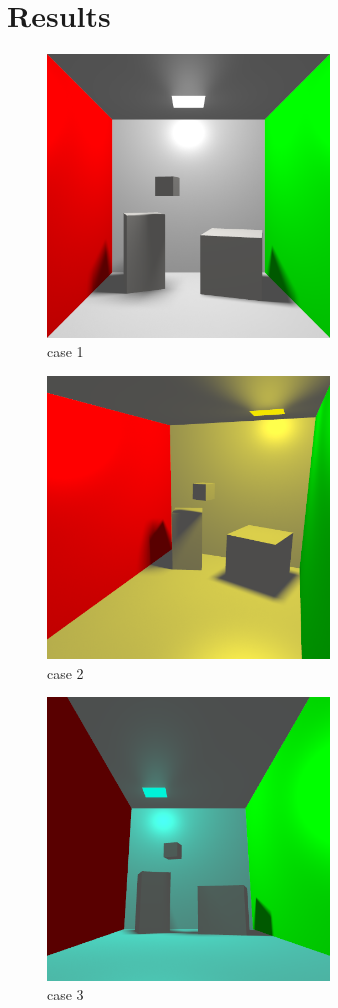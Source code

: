 \documentclass[acmtog]{acmart}
\begin{document}
\section{Results}
\begin{figure}[h]
	\centering
	\includegraphics[height = 7.5cm]{output1.png}
	\caption{case 1}
\end{figure}
\begin{figure}[h]
	\centering
	\includegraphics[height = 7.5cm]{output2.png}
	\caption{case 2}
\end{figure}
\begin{figure}[h]
	\centering
	\includegraphics[height = 7.5cm]{output3.png}
	\caption{case 3}
\end{figure}
\\
\end{document}
